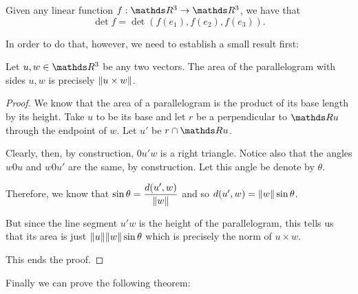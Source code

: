 \begin{theorem}
	Given any linear function $f:\R^3\to \R^3$, we have that\[\det f=\det(f(e_1),f(e_2),f(e_3)).\]
\end{theorem}

In order to do that, however, we need to establish a small result first:

\begin{lemma}
	Let $u,w\in \R^3$ be any two vectors. The area of the parallelogram with sides $u,w$ is precisely $\lVert u\times w\rVert$.
\end{lemma}
\begin{proof}
	We know that the area of a parallelogram is the product of its base length by its height. Take $u$ to be its base and let $r$ be a perpendicular to $\R u$ through the endpoint of $w$. Let $u'$ be $r\cap \R u$.
	
	Clearly, then, by construction, $0u'w$ is a right triangle. Notice also that the angles $w0u$ and $w0u'$ are the same, by construction. Let this angle be denote by $\theta$.
	
	Therefore, we know that $\sin\theta = \dfrac{d(u',w)}{\lVert w\rVert}$ and so $d(u',w)=\lVert w\rVert\sin\theta$.
	
	But since the line segment $u'w$ is the height of the parallelogram, this tells us that its area is just $\lVert u\rVert\lVert w\rVert\sin\theta$ which is precisely the norm of $u\times w$.
	
	This ends the proof.
\end{proof}

Finally we can prove the following theorem:


